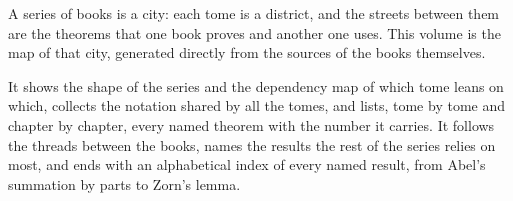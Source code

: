 A series of books is a city: each tome is a district, and the streets between them are the theorems that one book
proves and another one uses. This volume is the map of that city, generated directly from the sources of the
books themselves.

It shows the shape of the series and the dependency map of which tome leans on which, collects the notation shared
by all the tomes, and lists, tome by tome and chapter by chapter, every named theorem with the number it carries.
It follows the threads between the books, names the results the rest of the series relies on most, and ends with
an alphabetical index of every named result, from Abel's summation by parts to Zorn's lemma.
